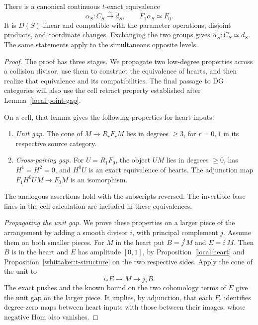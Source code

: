 \begin{proposition}\label{local:one-slot}
There is a canonical continuous $t$-exact equivalence
\begin{equation}\label{eq:L11}
 \alpha_S:C_S\xrightarrow{\ \sim\ }\check d_S,
                 \qquad F_1\alpha_S\simeq F_0.
\end{equation}
It is $D(S)$-linear and compatible with the parameter operations,
disjoint products, and coordinate changes.  Exchanging the two
groups gives $\check\alpha_S:\check C_S\simeq d_S$.
The same statements apply to the simultaneous opposite levels.
\end{proposition}

\begin{proof}
The proof has three stages.  We propagate two low-degree properties
across a collision divisor, use them to construct the equivalence of
hearts, and then realize that equivalence and its compatibilities.
The final passage to DG categories will also use the cell retract
property established after Lemma~\ref{local:point-gap}.

On a cell, that lemma gives the following properties for heart inputs:
\begin{enumerate}
\item \emph{Unit gap.}  The cone of $M\to R_rF_rM$ lies in degrees
      $\ge3$, for $r=0,1$ in its respective source category.
\item \emph{Cross-pairing gap.}  For $U=R_1F_0$, the object $UM$ lies in degrees $\ge0$,
      has $H^1=H^2=0$, and $H^0U$ is an exact equivalence of
      hearts.  The adjunction map
      $F_1H^0UM\to F_0M$ is an isomorphism.
\end{enumerate}
The analogous assertions hold with the subscripts reversed.
The invertible base lines in the cell calculation are included
in these equivalences.

\smallskip
\noindent\emph{Propagating the unit gap.}
We prove these properties on a larger piece of the arrangement by
adding a smooth divisor $i$, with principal complement $j$.
Assume them on both smaller pieces.  For $M$ in the heart put
$B=j^!M$ and $E=i^!M$.  Then $B$ is in the heart and $E$ has
amplitude $[0,1]$, by Proposition~\ref{local:heart} and
Proposition~\ref{whittaker:t-structure} on the two respective sides.
Apply the cone of the unit to
\[
                  i_*E\longrightarrow M\longrightarrow j_*B.
\]
The exact pushes and the known bound on the two cohomology terms
of $E$ give the unit gap on the larger piece.  It implies, by
adjunction, that each $F_r$ identifies degree-zero maps between heart inputs with
those between their images, whose negative Hom also vanishes.


\end{proof}
